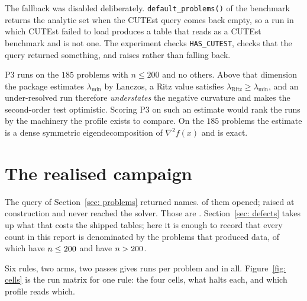 \documentclass[11pt,a4paper]{article}
\theoremstyle{remark}
\begin{document}
The fallback was disabled deliberately. \texttt{default\_problems()} of the
benchmark returns the analytic set when the CUTEst query comes back empty, so a
run in which CUTEst failed to load produces a table that reads as a CUTEst
benchmark and is not one. The experiment checks \texttt{HAS\_CUTEST}, checks that
the query returned something, and raises rather than falling back.

P3 runs on the $185$ problems with $n \leq 200$ and no others. Above that
dimension the package estimates $\lambda_{\min}$ by Lanczos, a Ritz value
satisfies $\lambda_{\text{Ritz}} \geq \lambda_{\min}$, and an under-resolved run
therefore \emph{understates} the negative curvature and makes the second-order
test optimistic. Scoring P3 on such an estimate would rank the runs by the
machinery the profile exists to compare. On the $185$ problems the estimate is a
dense symmetric eigendecomposition of $\nabla^2 f(x)$ and is exact.

\section{The realised campaign}\label{sec: realised}

The query of Section~\ref{sec: problems} returned \NListed{} names. \NOpened{} of
them opened; \NNeverOp{} raised at construction and never reached the solver.
Those \NNeverOp{} are \NeverOpened{}. Section~\ref{sec: defects} takes up what
that costs the shipped tables; here it is enough to record that every count in
this report is denominated by the \NOpened{} problems that produced data, of which
\NSmall{} have $n \leq 200{}$ and \NBig{} have $n > 200{}$.

Six rules, two arms, two passes gives \NRunsPerProblem{} runs per problem and
\NRuns{} in all. Figure~\ref{fig: cells} is the run matrix for one rule: the
four cells, what halts each, and which profile reads which.
\end{document}
